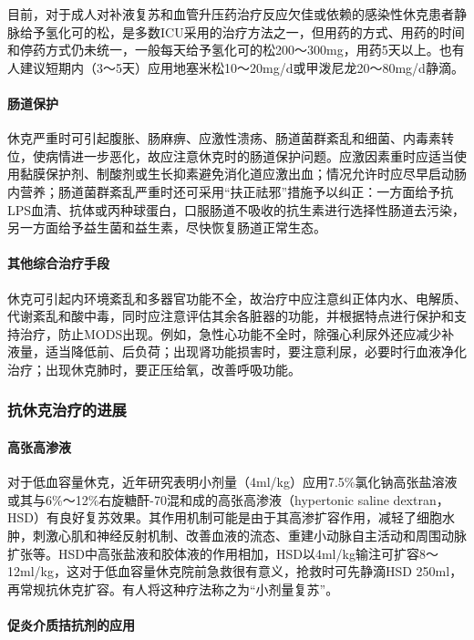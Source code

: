 目前，对于成人对补液复苏和血管升压药治疗反应欠佳或依赖的感染性休克患者静脉给予氢化可的松，是多数ICU采用的治疗方法之一，但用药的方式、用药的时间和停药方式仍未统一，一般每天给予氢化可的松200～300mg，用药5天以上。也有人建议短期内（3～5天）应用地塞米松10～20mg/d或甲泼尼龙20～80mg/d静滴。

\paragraph{肠道保护}

休克严重时可引起腹胀、肠麻痹、应激性溃疡、肠道菌群紊乱和细菌、内毒素转位，使病情进一步恶化，故应注意休克时的肠道保护问题。应激因素重时应适当使用黏膜保护剂、制酸剂或生长抑素避免消化道应激出血；情况允许时应尽早启动肠内营养；肠道菌群紊乱严重时还可采用“扶正祛邪”措施予以纠正：一方面给予抗LPS血清、抗体或丙种球蛋白，口服肠道不吸收的抗生素进行选择性肠道去污染，另一方面给予益生菌和益生素，尽快恢复肠道正常生态。

\paragraph{其他综合治疗手段}

休克可引起内环境紊乱和多器官功能不全，故治疗中应注意纠正体内水、电解质、代谢紊乱和酸中毒，同时应注意评估其余各脏器的功能，并根据特点进行保护和支持治疗，防止MODS出现。例如，急性心功能不全时，除强心利尿外还应减少补液量，适当降低前、后负荷；出现肾功能损害时，要注意利尿，必要时行血液净化治疗；出现休克肺时，要正压给氧，改善呼吸功能。

\subsubsection{抗休克治疗的进展}

\paragraph{高张高渗液}

对于低血容量休克，近年研究表明小剂量（4ml/kg）应用7.5\%氯化钠高张盐溶液或其与6\%～12\%右旋糖酐-70混和成的高张高渗液（hypertonic
saline
dextran，HSD）有良好复苏效果。其作用机制可能是由于其高渗扩容作用，减轻了细胞水肿，刺激心肌和神经反射机制、改善血液的流态、重建小动脉自主活动和周围动脉扩张等。HSD中高张盐液和胶体液的作用相加，HSD以4ml/kg输注可扩容8～12ml/kg，这对于低血容量休克院前急救很有意义，抢救时可先静滴HSD
250ml，再常规抗休克扩容。有人将这种疗法称之为“小剂量复苏”。

\paragraph{促炎介质拮抗剂的应用}

